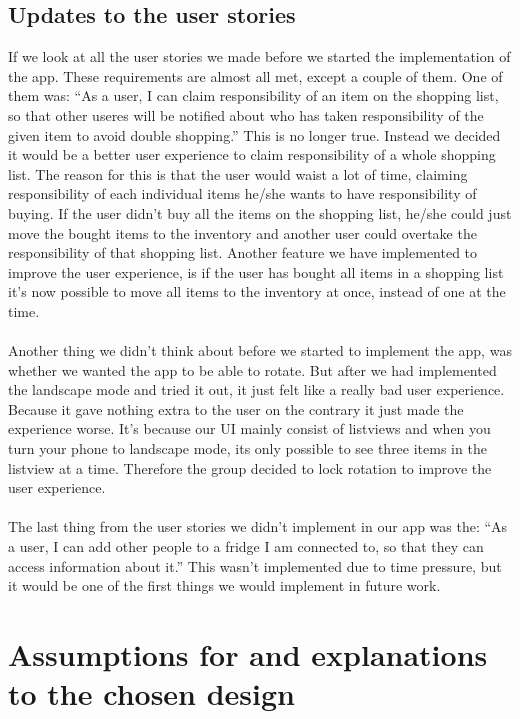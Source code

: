 \documentclass[12pt]{article}
\begin{document}
\subsection{Updates to the user stories}
If we look at all the user stories we made before we started the implementation of the app. These requirements are almost all met, except a couple of them. One of them was: “As a user, I can claim responsibility of an item on the shopping list, so that other useres will be notified about who has taken responsibility of the given item to avoid double shopping.” This is no longer true. Instead we decided it would be a better user experience to claim responsibility of a whole shopping list. The reason for this is that the user would waist a lot of time, claiming responsibility of each individual items he/she wants to have responsibility of buying. If the user didn’t buy all the items on the shopping list, he/she could just move the bought items to the inventory and another user could overtake the responsibility of that shopping list. 
Another feature we have implemented to improve the user experience, is if the user has bought all items in a shopping list it’s now possible to move all items to the inventory at once, instead of one at the time.  
\\
\\
Another thing we didn’t think about before we started to implement the app, was whether we wanted the app to be able to rotate. But after we had implemented the landscape mode and tried it out, it just felt like a really bad user experience. Because it gave nothing extra to the user on the contrary it just made the experience worse. It’s because our UI mainly consist of listviews and when you  turn your phone to landscape mode, its only possible to see three items in the listview at a time. Therefore the group decided to lock rotation to improve the user experience.
\\
\\
The last thing from the user stories we didn’t implement in our app was the: “As a user, I can add other people to a fridge I am connected to, so that they can access information about it.” This wasn’t implemented due to time pressure, but it would be one of the first things we would implement in future work. 


\section{Assumptions for and explanations to the chosen design}
\end{document}
